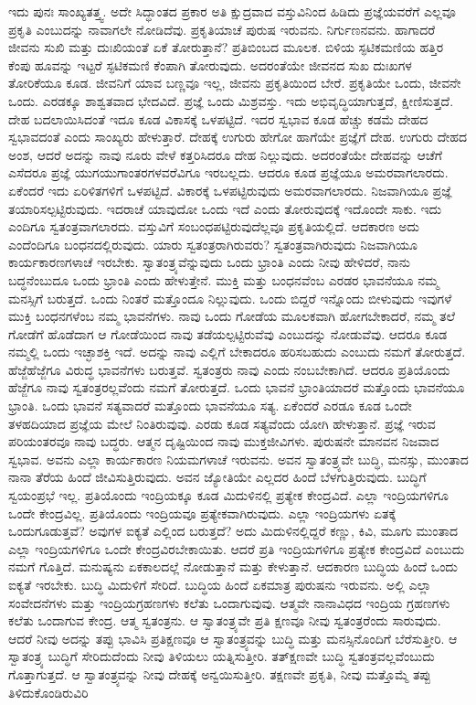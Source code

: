 ಇದು ಪುನಃ ಸಾಂಖ್ಯತತ್ತ್ವ. ಅದೇ ಸಿದ್ಧಾಂತದ ಪ್ರಕಾರ ಅತಿ ಕ್ಷುದ್ರವಾದ ವಸ್ತುವಿನಿಂದ ಹಿಡಿದು ಪ್ರಜ್ಞೆಯವರೆಗೆ ಎಲ್ಲವೂ ಪ್ರಕೃತಿ ಎಂಬುದನ್ನು ನಾವಾಗಲೇ ನೋಡಿದೆವು. ಪ್ರಕೃತಿಯಾಚೆ ಪುರುಷ ಇರುವನು. ನಿರ್ಗುಣನವನು. ಹಾಗಾದರೆ ಜೀವನು ಸುಖಿ ಮತ್ತು ದುಃಖಿಯಂತೆ ಏಕೆ ತೋರುತ್ತಾನೆ? ಪ್ರತಿಬಿಂಬದ ಮೂಲಕ. ಬಿಳಿಯ ಸ್ಫಟಿಕಮಣಿಯ ಹತ್ತಿರ ಕೆಂಪು ಹೂವನ್ನು ಇಟ್ಟರೆ ಸ್ಫಟಿಕಮಣಿ ಕೆಂಪಾಗಿ ತೋರುವುದು. ಅದರಂತೆಯೇ ಜೀವನದ ಸುಖ ದುಃಖಗಳ ತೋರಿಕೆಯೂ ಕೂಡ. ಜೀವನಿಗೆ ಯಾವ ಬಣ್ಣವೂ ಇಲ್ಲ, ಜೀವನು ಪ್ರಕೃತಿಯಿಂದ ಬೇರೆ. ಪ್ರಕೃತಿಯೇ ಒಂದು, ಜೀವನೇ ಒಂದು. ಎರಡಕ್ಕೂ ಶಾಶ್ವತವಾದ ಭೇದವಿದೆ. ಪ್ರಜ್ಞೆ ಒಂದು ಮಿಶ್ರವಸ್ತು. ಇದು ಅಭಿವೃದ್ಧಿಯಾಗುತ್ತದೆ, ಕ್ಷೀಣಿಸುತ್ತದೆ. ದೇಹ ಬದಲಾಯಿಸಿದಂತೆ ಇದೂ ಕೂಡ ವಿಕಾಸಕ್ಕೆ ಒಳಪಟ್ಟಿದೆ. ಇದರ ಸ್ವಭಾವ ಕೂಡ ಹೆಚ್ಚು ಕಡಮೆ ದೇಹದ ಸ್ವಭಾವದಂತೆ ಎಂದು ಸಾಂಖ್ಯರು ಹೇಳುತ್ತಾರೆ. ದೇಹಕ್ಕೆ ಉಗುರು ಹೇಗೋ ಹಾಗೆಯೇ ಪ್ರಜ್ಞೆಗೆ ದೇಹ. ಉಗುರು ದೇಹದ ಅಂಶ, ಆದರೆ ಅದನ್ನು ನಾವು ನೂರು ವೇಳೆ ಕತ್ತರಿಸಿದರೂ ದೇಹ ನಿಲ್ಲುವುದು. ಅದರಂತೆಯೇ ದೇಹವನ್ನು ಆಚೆಗೆ ಎಸೆದರೂ ಪ್ರಜ್ಞೆ ಯುಗಯುಗಾಂತರಗಳವರೆವಿಗೂ ಇರಬಲ್ಲದು. ಆದರೂ ಕೂಡ ಪ್ರಜ್ಞೆಯೂ ಅಮರವಾಗಲಾರದು. ಏಕೆಂದರೆ ಇದು ಏರಿಳಿತಗಳಿಗೆ ಒಳಪಟ್ಟಿದೆ. ವಿಕಾರಕ್ಕೆ ಒಳಪಟ್ಟಿರುವುದು ಅಮರವಾಗಲಾರದು. ನಿಜವಾಗಿಯೂ ಪ್ರಜ್ಞೆ ತಯಾರಿಸಲ್ಪಟ್ಟಿರುವುದು. ಇದರಾಚೆ ಯಾವುದೋ ಒಂದು ಇದೆ ಎಂದು ತೋರುವುದಕ್ಕೆ ಇದೊಂದೇ ಸಾಕು. ಇದು ಎಂದಿಗೂ ಸ್ವತಂತ್ರವಾಗಲಾರದು. ವಸ್ತುವಿಗೆ ಸಂಬಂಧಪಟ್ಟಿರುವುದೆಲ್ಲವೂ ಪ್ರಕೃತಿಯಲ್ಲಿದೆ. ಆದಕಾರಣ ಅದು ಎಂದೆಂದಿಗೂ ಬಂಧನದಲ್ಲಿರುವುದು. ಯಾರು ಸ್ವತಂತ್ರರಾಗಿರುವರು? ಸ್ವತಂತ್ರವಾಗಿರುವುದು ನಿಜವಾಗಿಯೂ ಕಾರ್ಯಕಾರಣಗಳಾಚೆ ಇರಬೇಕು. ಸ್ವಾತಂತ್ರ್ಯವೆನ್ನುವುದು ಒಂದು ಭ್ರಾಂತಿ ಎಂದು ನೀವು ಹೇಳಿದರೆ, ನಾನು ಬದ್ಧನೆಂಬುದೂ ಒಂದು ಭ್ರಾಂತಿ ಎಂದು ಹೇಳುತ್ತೇನೆ. ಮುಕ್ತಿ ಮತ್ತು ಬಂಧನವೆಂಬ ಎರಡರ ಭಾವನೆಯೂ ನಮ್ಮ ಮನಸ್ಸಿಗೆ ಬರುತ್ತದೆ. ಒಂದು ನಿಂತರೆ ಮತ್ತೊಂದೂ ನಿಲ್ಲುವುದು. ಒಂದು ಬಿದ್ದರೆ ಇನ್ನೊಂದು ಬೀಳುವುದು ಇವುಗಳೆ ಮುಕ್ತಿ ಬಂಧನಗಳೆಂಬ ನಮ್ಮ ಭಾವನೆಗಳು. ನಾವು ಒಂದು ಗೋಡೆಯ ಮೂಲಕವಾಗಿ ಹೋಗಬೇಕಾದರೆ, ನಮ್ಮ ತಲೆ ಗೋಡೆಗೆ ಹೊಡೆದಾಗ ಆ ಗೋಡೆಯಿಂದ ನಾವು ತಡೆಯಲ್ಪಟ್ಟಿರುವೆವು ಎಂಬುದನ್ನು ನೋಡುವೆವು. ಆದರೂ ಕೂಡ ನಮ್ಮಲ್ಲಿ ಒಂದು ಇಚ್ಛಾಶಕ್ತಿ ಇದೆ. ಅದನ್ನು ನಾವು ಎಲ್ಲಿಗೆ ಬೇಕಾದರೂ ಹರಿಸಬಹುದು ಎಂಬುದು ನಮಗೆ ತೋರುತ್ತದೆ. ಹೆಜ್ಜೆಹೆಜ್ಜೆಗೂ ವಿರುದ್ಧ ಭಾವನೆಗಳು ಬರುತ್ತವೆ. ಸ್ವತಂತ್ರರು ನಾವು ಎಂದು ನಂಬಬೇಕಾಗಿದೆ. ಆದರೂ ಪ್ರತಿಯೊಂದು ಹೆಜ್ಜೆಗೂ ನಾವು ಸ್ವತಂತ್ರರಲ್ಲವೆಂದು ನಮಗೆ ತೋರುತ್ತದೆ. ಒಂದು ಭಾವನೆ ಭ್ರಾಂತಿಯಾದರೆ ಮತ್ತೊಂದು ಭಾವನೆಯೂ ಭ್ರಾಂತಿ. ಒಂದು ಭಾವನೆ ಸತ್ಯವಾದರೆ ಮತ್ತೊಂದು ಭಾವನೆಯೂ ಸತ್ಯ. ಏಕೆಂದರೆ ಎರಡೂ ಕೂಡ ಒಂದೇ ತಳಹದಿಯಾದ ಪ್ರಜ್ಞೆಯ ಮೇಲೆ ನಿಂತಿರುವುವು. ಎರಡು ಕೂಡ ಸತ್ಯವೆಂದು ಯೋಗಿ ಹೇಳುತ್ತಾನೆ. ಪ್ರಜ್ಞೆ ಇರುವ ಪರಿಯಂತರವೂ ನಾವು ಬದ್ಧರು. ಆತ್ಮನ ದೃಷ್ಟಿಯಿಂದ ನಾವು ಮುಕ್ತಜೀವಿಗಳು. ಪುರುಷನೇ ಮಾನವನ ನಿಜವಾದ ಸ್ವಭಾವ. ಅವನು ಎಲ್ಲಾ ಕಾರ್ಯಕಾರಣ ನಿಯಮಗಳಾಚೆ ಇರುವನು. ಅವನ ಸ್ವಾತಂತ್ರ್ಯವೇ ಬುದ್ಧಿ, ಮನಸ್ಸು, ಮುಂತಾದ ನಾನಾ ತೆರೆಯ ಹಿಂದೆ ಜೀವಿಸುತ್ತಿರುವುದು. ಅವನ ಜ್ಯೋತಿಯೇ ಎಲ್ಲದರ ಹಿಂದೆ ಬೆಳಗುತ್ತಿರುವುದು. ಬುದ್ಧಿಗೆ ಸ್ವಯಂಪ್ರಭೆ ಇಲ್ಲ. ಪ್ರತಿಯೊಂದು ಇಂದ್ರಿಯಕ್ಕೂ ಕೂಡ ಮಿದುಳಿನಲ್ಲಿ ಪ್ರತ್ಯೇಕ ಕೇಂದ್ರವಿದೆ. ಎಲ್ಲಾ ಇಂದ್ರಿಯಗಳಿಗೂ ಒಂದೇ ಕೇಂದ್ರವಿಲ್ಲ. ಪ್ರತಿಯೊಂದು ಇಂದ್ರಿಯವೂ ಪ್ರತ್ಯೇಕವಾಗಿರುವುದು. ಎಲ್ಲಾ ಇಂದ್ರಿಯಗಳು ಏತಕ್ಕೆ ಒಂದುಗೂಡುತ್ತವೆ? ಅವುಗಳ ಐಕ್ಯತೆ ಎಲ್ಲಿಂದ ಬರುತ್ತದೆ? ಅದು ಮಿದುಳಿನಲ್ಲಿದ್ದರೆ ಕಣ್ಣು, ಕಿವಿ, ಮೂಗು ಮುಂತಾದ ಎಲ್ಲಾ ಇಂದ್ರಿಯಗಳಿಗೂ ಒಂದೇ ಕೇಂದ್ರವಿರಬೇಕಾಯಿತು. ಆದರೆ ಪ್ರತಿ ಇಂದ್ರಿಯಗಳಿಗೂ ಪ್ರತ್ಯೇಕ ಕೇಂದ್ರವಿದೆ ಎಂಬುದು ನಮಗೆ ಗೊತ್ತಿದೆ. ಮನುಷ್ಯನು ಏಕಕಾಲದಲ್ಲೆ ನೋಡುತ್ತಾನೆ ಮತ್ತು ಕೇಳುತ್ತಾನೆ. ಆದಕಾರಣ ಬುದ್ಧಿಯ ಹಿಂದೆ ಒಂದು ಐಕ್ಯತೆ ಇರಬೇಕು. ಬುದ್ಧಿ ಮಿದುಳಿಗೆ ಸೇರಿದೆ. ಬುದ್ಧಿಯ ಹಿಂದೆ ಏಕಮಾತ್ರ ಪುರುಷನು ಇರುವನು. ಅಲ್ಲಿ ಎಲ್ಲಾ ಸಂವೇದನೆಗಳು ಮತ್ತು ಇಂದ್ರಿಯಗ್ರಹಣಗಳು ಕಲೆತು ಒಂದಾಗುವುವು. ಆತ್ಮವೇ ನಾನಾವಿಧದ ಇಂದ್ರಿಯ ಗ್ರಹಣಗಳು ಕಲೆತು ಒಂದಾಗುವ ಕೇಂದ್ರ. ಆತ್ಮ ಸ್ವತಂತ್ರನು. ಆ ಸ್ವಾತಂತ್ರ್ಯವೇ ಪ್ರತಿ ಕ್ಷಣವೂ ನೀವು ಸ್ವತಂತ್ರರೆಂದು ಸಾರುವುದು. ಆದರೆ ನೀವು ಅದನ್ನು ತಪ್ಪು ಭಾವಿಸಿ ಪ್ರತಿಕ್ಷಣವೂ ಆ ಸ್ವಾತಂತ್ರ್ಯವನ್ನು ಬುದ್ಧಿ ಮತ್ತು ಮನಸ್ಸಿನೊಂದಿಗೆ ಬೆರೆಸುತ್ತೀರಿ. ಆ ಸ್ವಾತಂತ್ರ್ಯ ಬುದ್ಧಿಗೆ ಸೇರಿದುದೆಂದು ನೀವು ತಿಳಿಯಲು ಯತ್ನಿಸುತ್ತೀರಿ. ತತ್​ಕ್ಷಣವೇ ಬುದ್ಧಿ ಸ್ವತಂತ್ರವಲ್ಲವೆಂಬುದು ಗೊತ್ತಾಗುತ್ತದೆ. ಆ ಸ್ವಾತಂತ್ರ್ಯವನ್ನು ನೀವು ದೇಹಕ್ಕೆ ಅನ್ವಯಿಸುತ್ತೀರಿ. ತಕ್ಷಣವೇ ಪ್ರಕೃತಿ, ನೀವು ಮತ್ತೊಮ್ಮೆ ತಪ್ಪು ತಿಳಿದುಕೊಂಡಿರುವಿರಿ 